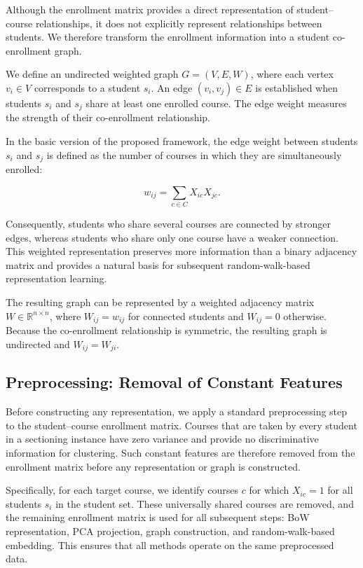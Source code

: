 \documentclass[pdflatex,sn-mathphys-num,iicol]{sn-jnl}%
\theoremstyle{thmstyleone}%
\theoremstyle{thmstyletwo}%
\theoremstyle{thmstylethree}%
\begin{document}
Although the enrollment matrix provides a direct representation of student--course relationships, it does not explicitly represent relationships between students. We therefore transform the enrollment information into a student co-enrollment graph.

We define an undirected weighted graph $G=(V,E,W)$, where each vertex $v_i\in V$ corresponds to a student $s_i$. An edge $(v_i,v_j)\in E$ is established when students $s_i$ and $s_j$ share at least one enrolled course. The edge weight measures the strength of their co-enrollment relationship.

In the basic version of the proposed framework, the edge weight between students $s_i$ and $s_j$ is defined as the number of courses in which they are simultaneously enrolled:

$$
w_{ij}=\sum_{c\in C}X_{ic}X_{jc}.
$$

Consequently, students who share several courses are connected by stronger edges, whereas students who share only one course have a weaker connection. This weighted representation preserves more information than a binary adjacency matrix and provides a natural basis for subsequent random-walk-based representation learning.

The resulting graph can be represented by a weighted adjacency matrix $W\in\mathbb{R}^{n\times n}$, where $W_{ij}=w_{ij}$ for connected students and $W_{ij}=0$ otherwise. Because the co-enrollment relationship is symmetric, the resulting graph is undirected and $W_{ij}=W_{ji}$.

\subsection{Preprocessing: Removal of Constant Features}
\label{subsec:preprocessing}

Before constructing any representation, we apply a standard preprocessing step to the student--course enrollment matrix. Courses that are taken by every student in a sectioning instance have zero variance and provide no discriminative information for clustering. Such constant features are therefore removed from the enrollment matrix before any representation or graph is constructed.

Specifically, for each target course, we identify courses $c$ for which $X_{ic}=1$ for all students $s_i$ in the student set. These universally shared courses are removed, and the remaining enrollment matrix is used for all subsequent steps: BoW representation, PCA projection, graph construction, and random-walk-based embedding. This ensures that all methods operate on the same preprocessed data.
\end{document}
